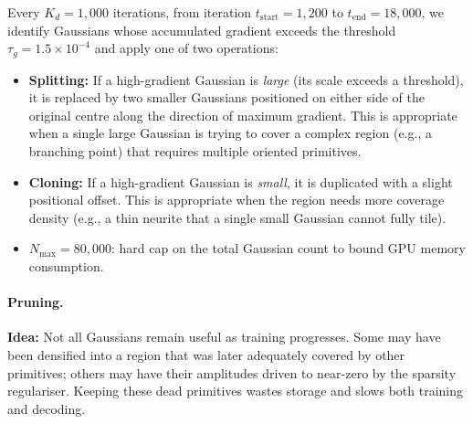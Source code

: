 \documentclass[11pt,a4paper]{article}
\begin{document}
Every $K_d = 1{,}000$ iterations, from iteration $t_{\mathrm{start}} = 1{,}200$ to $t_{\mathrm{end}} = 18{,}000$, we identify Gaussians whose accumulated gradient exceeds the threshold $\tau_g = 1.5\times10^{-4}$ and apply one of two operations:
\begin{itemize}
    \item \textbf{Splitting:} If a high-gradient Gaussian is \emph{large} (its scale exceeds a threshold), it is replaced by two smaller Gaussians positioned on either side of the original centre along the direction of maximum gradient.  This is appropriate when a single large Gaussian is trying to cover a complex region (e.g., a branching point) that requires multiple oriented primitives.
    \item \textbf{Cloning:} If a high-gradient Gaussian is \emph{small}, it is duplicated with a slight positional offset.  This is appropriate when the region needs more coverage density (e.g., a thin neurite that a single small Gaussian cannot fully tile).
    \item $N_{\max} = 80{,}000$: hard cap on the total Gaussian count to bound GPU memory consumption.
\end{itemize}

\paragraph{Pruning.}
\textbf{Idea:} Not all Gaussians remain useful as training progresses.  Some may have been densified into a region that was later adequately covered by other primitives; others may have their amplitudes driven to near-zero by the sparsity regulariser.  Keeping these dead primitives wastes storage and slows both training and decoding.
\end{document}
